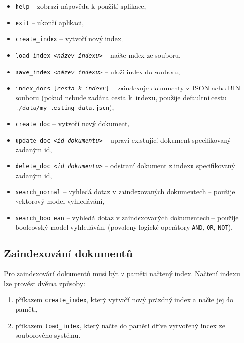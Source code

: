 \documentclass[
11pt,
a4paper,
pdftex,
czech,
titlepage
]{report}
\begin{document}
\begin{itemize}
    \item \texttt{help} -- zobrazí nápovědu k použití aplikace,
    \item \texttt{exit} -- ukončí aplikaci,
    \item \texttt{create\_index} -- vytvoří nový index,
    \item \texttt{load\_index <\textit{název indexu}>} -- načte index ze souboru,
    \item \texttt{save\_index <\textit{název indexu}>} -- uloží index do souboru,
    \item \begin{sloppypar}\texttt{index\_docs [\textit{cesta k indexu}]} -- zaindexuje dokumenty z JSON nebo BIN souboru (pokud nebude zadána cesta k~indexu, použije defaultní cestu \texttt{./data/my\_testing\_data.json}),\end{sloppypar}
    \item \texttt{create\_doc} -- vytvoří nový dokument,
    \item \texttt{update\_doc <\textit{id dokumentu}>} -- upraví existující dokument specifikovaný zadaným id,
    \item \texttt{delete\_doc <\textit{id dokumentu}>} -- odstraní dokument z indexu specifikovaný zadaným id,
    \item \texttt{search\_normal} -- vyhledá dotaz v zaindexovaných dokumentech -- použije vektorový model vyhledávání,
    \item \texttt{search\_boolean} -- vyhledá dotaz v zaindexovaných dokumentech -- použije booleovský model vyhledávání (povoleny logické operátory \texttt{AND}, \texttt{OR}, \texttt{NOT}).
\end{itemize}

\subsection{Zaindexování dokumentů}
Pro zaindexování dokumentů musí být v paměti načtený index. Načtení indexu lze provést dvěma způsoby:

\begin{enumerate}
    \item příkazem \texttt{create\_index}, který vytvoří nový prázdný index a načte jej do paměti,
    \item příkazem \texttt{load\_index}, který načte do paměti dříve vytvořený index ze souborového systému.
\end{enumerate}
\end{document}
